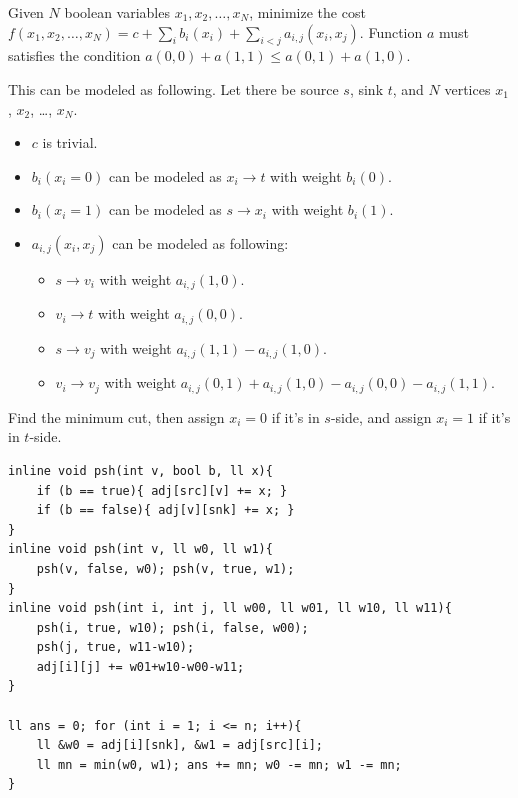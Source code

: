 Given $N$ boolean variables $x_{1}, x_{2}, \ldots, x_{N}$, minimize the cost $f(x_1, x_2, \ldots, x_N) = c + \sum_{i} b_i(x_i) + \sum_{i<j} a_{i,j}(x_i, x_j)$.
Function $a$ must satisfies the condition $a(0,0) + a(1,1) \leq a(0,1) + a(1,0)$.

This can be modeled as following. Let there be source $s$, sink $t$, and $N$ vertices $x_1$, $x_2$, \ldots, $x_N$.
\begin{itemize}
	\item $c$ is trivial.
	\item $b_i(x_i = 0)$ can be modeled as $x_i \to t$ with weight $b_i(0)$.
	\item $b_i(x_i = 1)$ can be modeled as $s \to x_i$ with weight $b_i(1)$.
	\item $a_{i,j}(x_i, x_j)$ can be modeled as following:
	\begin{itemize}
		\item $s \to v_i$ with weight $a_{i,j}(1,0)$.
		\item $v_i \to t$ with weight $a_{i,j}(0,0)$.
		\item $s \to v_j$ with weight $a_{i,j}(1,1)-a_{i,j}(1,0)$.
		\item $v_i \to v_j$ with weight $a_{i,j}(0,1)+a_{i,j}(1,0)-a_{i,j}(0,0)-a_{i,j}(1,1)$.
	\end{itemize}
\end{itemize}

Find the minimum cut, then assign $x_i = 0$ if it's in $s$-side, and assign $x_i = 1$ if it's in $t$-side.
\begin{verbatim}
inline void psh(int v, bool b, ll x){
    if (b == true){ adj[src][v] += x; }
    if (b == false){ adj[v][snk] += x; }
}
inline void psh(int v, ll w0, ll w1){
    psh(v, false, w0); psh(v, true, w1);
}
inline void psh(int i, int j, ll w00, ll w01, ll w10, ll w11){
    psh(i, true, w10); psh(i, false, w00);
    psh(j, true, w11-w10);
    adj[i][j] += w01+w10-w00-w11;
}

ll ans = 0; for (int i = 1; i <= n; i++){
	ll &w0 = adj[i][snk], &w1 = adj[src][i];
	ll mn = min(w0, w1); ans += mn; w0 -= mn; w1 -= mn;
}
\end{verbatim}